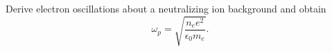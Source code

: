 \TODO\quad Derive electron oscillations about a neutralizing ion background and obtain
\begin{equation}
\boxed{\omega_p=\sqrt{\frac{n_e e^2}{\epsilon_0 m_e}}.}
\end{equation}
